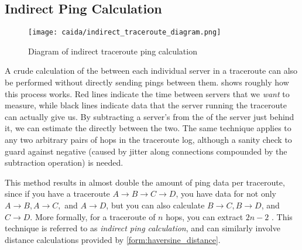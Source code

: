\subsection{Indirect Ping Calculation}

\begin{figure}[h]
    \centering
    \texttt{[image: caida/indirect\_traceroute\_diagram.png]}
    \caption{Diagram of indirect traceroute ping calculation}
    \label{fig:indirect_ping_diagram}
\end{figure}

A crude calculation of the \rtt between each individual server in a traceroute can also be performed without directly sending pings between them.  shows roughly how this process works. Red lines indicate the time between servers that we \textit{want} to measure, while black lines indicate data that the server running the traceroute can actually give us. By subtracting a server's \rtt from the \rtt of the server just behind it, we can estimate the \rtt directly between the two. The same technique applies to any two arbitrary pairs of hops in the traceroute log, although a sanity check to guard against negative \rtts (caused by jitter along connections compounded by the subtraction operation) is needed.

This method results in almost double the amount of ping data per traceroute, since if you have a traceroute $A\rightarrow B\rightarrow C\rightarrow D$, you have data for not only $A\rightarrow B, A\rightarrow C,$ and $A\rightarrow D$, but you can also calculate $B\rightarrow C, B\rightarrow D$, and $C\rightarrow D$. More formally, for a traceroute of $n$ hops, you can extract $2n-2$ \rtts. This technique is referred to as \textit{indirect ping calculation}, and can similarly involve distance calculations provided by \cref{form:haversine_distance}.
